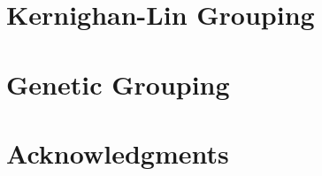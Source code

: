 \documentclass[a0paper,fleqn]{betterposter}
\begin{document}
{\section{Kernighan-Lin Grouping}

\section{Genetic Grouping}

\section{Acknowledgments}

}
\end{document}
